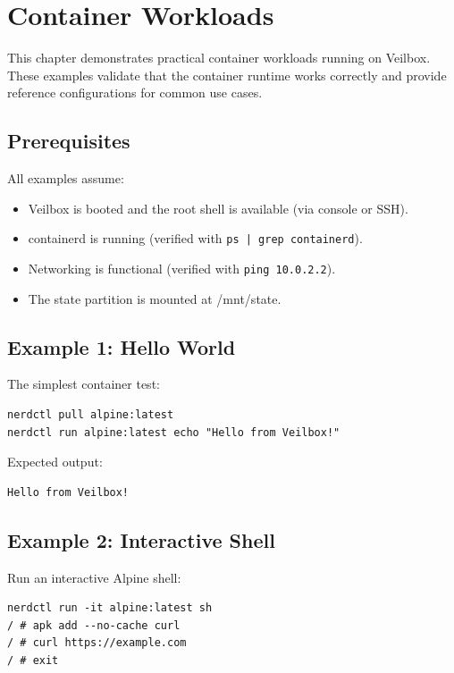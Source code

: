 \chapter{Container Workloads}
\label{ch:workloads}

This chapter demonstrates practical container workloads running on
Veilbox. These examples validate that the container runtime works
correctly and provide reference configurations for common use cases.

\section{Prerequisites}

All examples assume:
\begin{itemize}[nosep]
  \item Veilbox is booted and the root shell is available (via console
        or SSH).
  \item containerd is running (verified with \texttt{ps | grep containerd}).
  \item Networking is functional (verified with \texttt{ping 10.0.2.2}).
  \item The state partition is mounted at /mnt/state.
\end{itemize}

\section{Example 1: Hello World}

The simplest container test:

\begin{lstlisting}
nerdctl pull alpine:latest
nerdctl run alpine:latest echo "Hello from Veilbox!"
\end{lstlisting}

Expected output:
\begin{lstlisting}
Hello from Veilbox!
\end{lstlisting}

\section{Example 2: Interactive Shell}

Run an interactive Alpine shell:

\begin{lstlisting}
nerdctl run -it alpine:latest sh
/ # apk add --no-cache curl
/ # curl https://example.com
/ # exit
\end{lstlisting}

